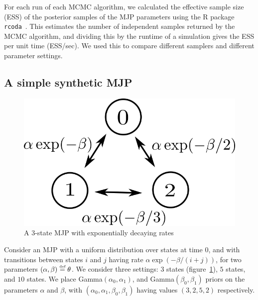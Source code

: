 For each run of each MCMC algorithm, we calculated the effective sample size (ESS) of the posterior samples of the MJP parameters using the R package \texttt{rcoda}~\citep{Rcoda2006}. 
This estimates the number of independent samples returned by the MCMC algorithm, and dividing this by the runtime of a simulation gives the ESS per unit time (ESS/sec). 
We used this to compare different samplers and different parameter settings.

\subsection{A simple synthetic MJP}
\begin{figure}
    \vspace{-.5in}
  \begin{minipage}[!hp]{.05\linewidth}
    \hspace{.1in}
  \end{minipage}
  \begin{minipage}[!hp]{.9\linewidth}
  \centering
    \includegraphics [width=\textwidth, angle=0]{figs/exp_model.png}
    \caption{A 3-state MJP with exponentially decaying rates}
    \label{fig:exp_model}
      \end{minipage}
    \vspace{-.1in}
  \end{figure}
  Consider an MJP with a uniform distribution over states at time $0$, and with transitions between states $i$ and $j$ having rate $\alpha \exp(-\beta/(i+j))$, for two parameters $(\alpha,\beta) \defeq \theta$. 
We consider three settings: $3$ states (figure~\ref{fig:exp_model}), $5$ states, and $10$ states.
We place Gamma$(\alpha_0,\alpha_1)$, and Gamma$(\beta_0, \beta_1)$ priors on the parameters $\alpha$ and $\beta$, with $(\alpha_0,\alpha_1,\beta_0,\beta_1)$ having values $(3,2,5,2)$ respectively. 
